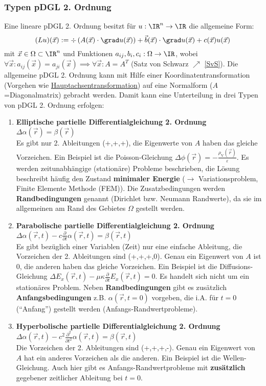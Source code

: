  \subsubsection{Typen pDGL 2. Ordnung}
 Eine lineare pDGL 2. Ordnung besitzt für $u:\IR^n\rightarrow\IR$ die allgemeine Form:
 \begin{equation}
 	(Lu)(\vec{x}):= \div\left(A(\vec{x})\cdot\grad u(\vec{x})\right)+\vec{b}(\vec{x})\cdot \grad u(\vec{x}) + c(\vec{x})u(\vec{x})
 \end{equation}
 mit $\vec{x}\in \Omega\subset\IR^n$ und Funktionen $a_{ij}, b_i, c_i : \Omega\rightarrow\IR$, wobei $\forall \vec{x}:a_{ij}(\vec{x})=a_{ji}(\vec{x}) \implies \forall \vec{x}: A=A^T$ (Satz von Schwarz $\nearrow$ \ref{SvS}). Die allgemeine pDGL 2. Ordnung kann mit Hilfe einer Koordinatentransformation (Vorgehen wie \href{https://de.wikipedia.org/wiki/Hauptachsentransformation}{Hauptachsentransformation}) auf eine Normalform ($A$=Diagonalmatrix) gebracht werden. Damit kann eine Unterteilung in drei Typen von pDGL 2. Ordnung erfolgen:
	 \begin{enumerate}
		 \item \textbf{Elliptische partielle Differentialgleichung 2. Ordnung} $\Delta \alpha(\vec{r} ) = \beta(\vec{r} )$\\
			       Es gibt nur 2. Ableitungen (+,+,+), die Eigenwerte von $A$ haben das gleiche Vorzeichen. Ein Beispiel ist die Poisson-Gleichung $\Delta \phi(\vec{r} )=-\frac{\rho_\text{V}(\vec{r} )}{\varepsilon}$. Es werden zeitunabhängige (stationäre) Probleme beschrieben, die  Lösung beschreibt häufig den Zustand \textbf{minimaler Energie} ($\to$ Variationsproblem, Finite Elemente Methode (FEM)). Die Zusatzbedingungen werden \textbf{Randbedingungen} genannt (Dirichlet bzw. Neumann Randwerte), da sie im allgemeinen am Rand des Gebietes $\Omega$ gestellt werden.
		 \item \textbf{Parabolische partielle Differentialgleichung 2. Ordnung} $\Delta \alpha(\vec{r} , t) - c\frac{\partial}{\partial t}\alpha(\vec{r} , t) = \beta(\vec{r} , t)$\\
			      Es gibt bezüglich einer Variablen (Zeit) nur eine einfache Ableitung, die Vorzeichen der 2. Ableitungen sind (+,+,+,0). Genau ein Eigenwert von $A$ ist 0, die anderen haben das gleiche Vorzeichen. Ein Beispiel ist die Diffusions-Gleichung $\Delta E_x(\vec{r} , t) -\mu\kappa \frac{\partial}{\partial t} E_x(\vec{r} , t) = 0$.
			       Es handelt sich nicht um ein stationäres Problem.  Neben \textbf{Randbedingungen} gibt es zusätzlich \textbf{Anfangsbedingungen} z.B. $\alpha(\vec{r} , t=0)$ vorgeben, die i.A. für $t=0$ (\enquote{Anfang}) gestellt werden (Anfangs-Randwertprobleme). 
		 \item \textbf{Hyperbolische partielle Differentialgleichung 2. Ordnung} $\Delta \alpha(\vec{r} , t) - c^2\frac{\partial^2}{\partial t^2}\alpha(\vec{r} , t) = \beta(\vec{r} , t)$\\
			       Die Vorzeichen der 2. Ableitungen sind (+,+,+,-). Genau ein Eigenwert von $A$ hat ein anderes Vorzeichen als die anderen. Ein Beispiel ist die Wellen-Gleichung. 
			       Auch hier gibt es Anfangs-Randwertprobleme mit \textbf{zusätzlich} gegebener zeitlicher Ableitung bei $t=0$.
	 \end{enumerate}
